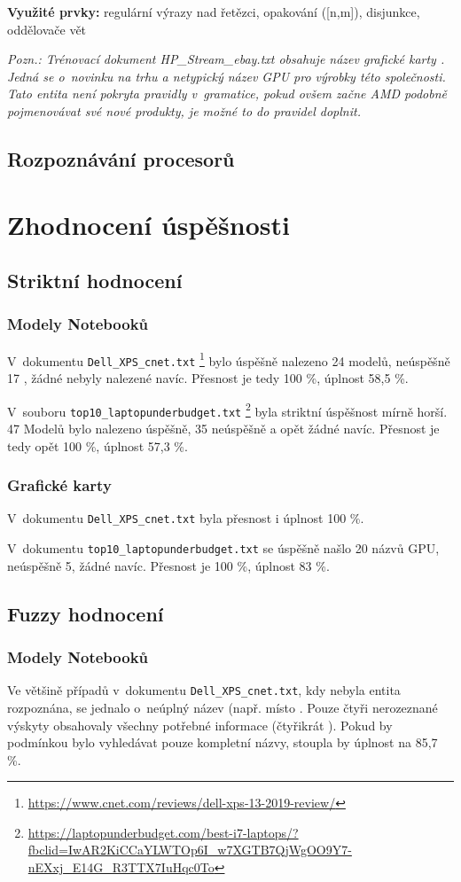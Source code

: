 \documentclass[a4,12pt]{article}
\let\Oldsection\section
\renewcommand{\section}{\FloatBarrier\Oldsection}
\let\Oldsubsection\subsection
\renewcommand{\subsection}{\FloatBarrier\Oldsubsection}
\let\Oldsubsubsection\subsubsection
\renewcommand{\subsubsection}{\FloatBarrier\Oldsubsubsection}
\begin{document}
\textbf{Využité prvky:} regulární výrazy nad řetězci, opakování ([n,m]), disjunkce, oddělovače vět 

\textit{Pozn.: Trénovací dokument HP\_Stream\_ebay.txt obsahuje název grafické karty . Jedná se o~novinku na trhu a netypický název GPU pro výrobky této společnosti. Tato entita není pokryta pravidly v~gramatice, pokud ovšem začne AMD podobně pojmenovávat své nové produkty, je možné to do pravidel doplnit.}
\subsection{Rozpoznávání procesorů}
\section{Zhodnocení úspěšnosti}
\subsection{Striktní hodnocení}
\subsubsection{Modely Notebooků}
V~dokumentu \texttt{Dell\_XPS\_cnet.txt}  \footnote{\url{https://www.cnet.com/reviews/dell-xps-13-2019-review/}} bylo úspěšně nalezeno 24 modelů, neúspěšně 17 , žádné nebyly nalezené navíc. Přesnost je tedy 100 \%, úplnost 58,5 \%.

V~souboru \texttt{top10\_laptopunderbudget.txt} \footnote{\url{https://laptopunderbudget.com/best-i7-laptops/?fbclid=IwAR2KiCCaYLWTOp6I_w7XGTB7QjWgOO9Y7-nEXxj_E14G_R3TTX7IuHqc0To}} byla striktní úspěšnost mírně horší. 47 Modelů bylo nalezeno úspěšně, 35 neúspěšně a opět žádné navíc. Přesnost je tedy opět 100 \%, úplnost 57,3 \%.

\subsubsection{Grafické karty}
V~dokumentu \texttt{Dell\_XPS\_cnet.txt} byla přesnost i úplnost 100 \%.

V~dokumentu \texttt{top10\_laptopunderbudget.txt} se úspěšně našlo 20 názvů GPU, neúspěšně 5, žádné navíc. Přesnost je 100 \%, úplnost 83 \%.
\subsection{Fuzzy hodnocení}
\subsubsection{Modely Notebooků}
Ve většině případů v~dokumentu \texttt{Dell\_XPS\_cnet.txt}, kdy nebyla entita rozpoznána, se jednalo o~neúplný název (např.  místo . Pouze čtyři nerozeznané výskyty obsahovaly všechny potřebné informace (čtyřikrát ). Pokud by podmínkou bylo vyhledávat pouze kompletní názvy, stoupla by úplnost na 85,7 \%.
\end{document}
